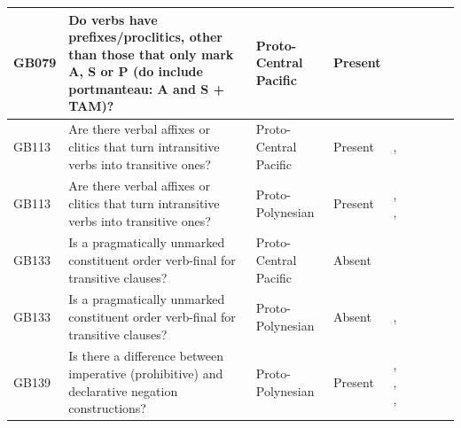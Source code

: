 \documentclass[a4paper,10pt]{article} %
\begin{document}
\begin{landscape}
\begin{longtable}{| p{2cm}| p{3cm}| p{2.5cm}|p{2cm}|p{2cm}|p{2cm}|p{2cm}|p{2cm}|p{2cm}|}
GB079&Do verbs have prefixes/proclitics, other than those that only mark A, S or P (do include portmanteau: A and S + TAM)?&Proto-Central Pacific&Present&\citet[352]{pawley1970change}& \cellcolor{hedvig_lightgreen!50}{True Positive} & \cellcolor{hedvig_lightgreen!50}{True Positive} & \cellcolor{hedvig_lightgreen!50}{True Positive} & \cellcolor{hedvig_lightgreen!50}{True Positive} \\ \hline
GB113&Are there verbal affixes or clitics that turn intransitive verbs into transitive ones?&Proto-Central Pacific&Present&\citet[352]{pawley1970change}, \citet[4]{marck2000_encyclo}& \cellcolor{hedvig_lightgreen!50}{True Positive} & \cellcolor{hedvig_lightgreen!50}{True Positive} & \cellcolor{hedvig_lightgreen!50}{True Positive} & \cellcolor{hedvig_lightgreen!50}{True Positive} \\ \hline
GB113&Are there verbal affixes or clitics that turn intransitive verbs into transitive ones?&Proto-Polynesian&Present&\citet[4]{marck2000_encyclo}, \citet[57]{jonsson1998}, \citet[352]{pawley1970change}& \cellcolor{hedvig_lightgreen!50}{True Positive} & \cellcolor{hedvig_lightgreen!50}{True Positive} & \cellcolor{hedvig_lightgreen!50}{True Positive} & \cellcolor{hedvig_lightgreen!50}{True Positive} \\ \hline
GB133&Is a pragmatically unmarked constituent order verb-final for transitive clauses?&Proto-Central Pacific&Absent&\citet[122]{kikusawa2002proto}& \cellcolor{hedvig_lightgreen!50}{True Negative} & \cellcolor{hedvig_yellow!50}{True Negative} & \cellcolor{hedvig_yellow!50}{True Negative} & \cellcolor{hedvig_yellow!50}{True Negative} \\ \hline
GB133&Is a pragmatically unmarked constituent order verb-final for transitive clauses?&Proto-Polynesian&Absent&\cite[15]{chung1978}, \citet[118]{pawley1973some}& \cellcolor{hedvig_lightgreen!50}{True Negative} & \cellcolor{hedvig_yellow!50}{True Negative} & \cellcolor{hedvig_yellow!50}{True Negative} & \cellcolor{hedvig_yellow!50}{True Negative} \\ \hline
GB139&Is there a difference between imperative (prohibitive) and declarative negation constructions?&Proto-Polynesian&Present&\citet[142]{pawley1973some}, \citet[292]{ross2007two}, \citet[xiii, 125]{clark1976aspects}, \citet[89]{lynchrosscrowley_proto_grammar_oceanic}& \cellcolor{hedvig_lightgreen!50}{True Positive} & \cellcolor{hedvig_lightgreen!50}{True Positive} & \cellcolor{hedvig_lightgreen!50}{True Positive} & \cellcolor{hedvig_lightgreen!50}{True Positive} \\ \hline

\end{longtable}
\end{landscape}
\end{document}
